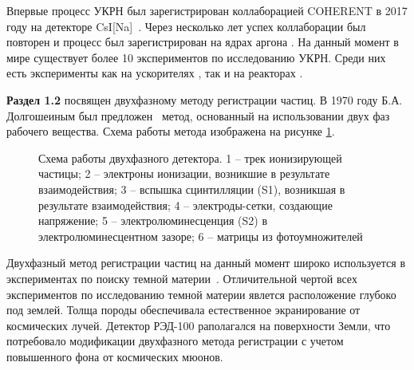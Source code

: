 Впервые процесс УКРН был зарегистрирован коллаборацией COHERENT в 2017 году на детекторе CsI[Na]~\cite{COHERENT:2017ipa}. Через несколько лет успех коллаборации был повторен и процесс был зарегистрирован на ядрах аргона \cite{PhysRevLett.126.012002}. На данный момент в мире существует более 10 экспериментов по исследованию УКРН. Среди них есть эксперименты как на ускорителях \cite{COHERENT:2018gft}, так и на реакторах \cite{Belov_2015, Aguilar-Arevalo_2016, ricochet, Buck_2020, Singh:2016glu, Strauss_2020, Chaudhuri:2022pqk}. 

\textbf{Раздел 1.2} посвящен двухфазному методу регистрации частиц. В 1970 году Б.А. Долгошеиным был предложен~\cite{Dolgoshein} метод, основанный на использовании двух фаз рабочего вещества. Схема работы метода изображена на рисунке \ref{img:twophase}.
\begin{figure}[h]
	\caption[Схема работы двухфазного детектора.] {Схема работы двухфазного детектора. 1 -- трек ионизирующей частицы; 2 -- электроны ионизации, возникшие в результате взаимодействия; 3 -- вспышка сцинтилляции (S1), возникшая в результате взаимодействия; 4 -- электроды-сетки, создающие напряжение; 5 -- электролюминесценция (S2) в электролюминесцентном зазоре; 6 -- матрицы из фотоумножителей}
	\label{img:twophase}
\end{figure}

Двухфазный метод регистрации частиц на данный момент широко используется в экспериментах по поиску темной материи~\cite{BOLOZDYNYA2015405}. Отличительной чертой всех экспериментов по исследованию темной материи явлется расположение глубоко под землей. Толща породы обеспечивала естественное экранирование от космических лучей. Детектор РЭД-100 раполагался на поверхности Земли, что потребовало модификации двухфазного метода регистрации с учетом повышенного фона от космических мюонов. 

